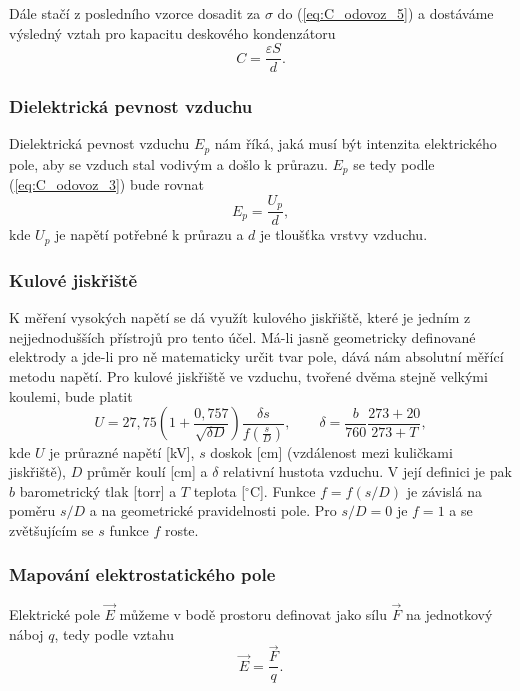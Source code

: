 \documentclass[english]{article}
\begin{document}
		Dále stačí z posledního vzorce dosadit za $\sigma$ do (\ref{eq:C_odovoz_5}) a dostáváme výsledný vztah pro kapacitu deskového kondenzátoru 
		\begin{equation} \label{eq:C_odovoz_7}
		C = \frac{\varepsilon S}{d}.
		\end{equation}
		
		\subsubsection{Dielektrická pevnost vzduchu}
		Dielektrická pevnost vzduchu $E_p$ nám říká, jaká musí být intenzita elektrického pole, aby se vzduch stal vodivým a došlo k průrazu. $E_p$ se tedy podle (\ref{eq:C_odovoz_3}) bude rovnat
		\begin{equation}
				E_p=\frac{U_p}{d},
				\label{eq:Ep}
		\end{equation}
		kde $U_p$ je napětí potřebné k průrazu a $d$ je tloušťka vrstvy vzduchu.
		
		\subsubsection{Kulové jiskřiště}
		K měření vysokých napětí se dá využít kulového jiskřiště, které je jedním z nejjednodušších přístrojů pro tento účel. Má-li jasně geometricky definované elektrody a jde-li pro ně matematicky určit tvar pole, dává nám absolutní měřící metodu napětí. Pro kulové jiskřiště ve vzduchu, tvořené dvěma stejně velkými koulemi, bude platit
		\begin{equation} \label{eq:jiskriste}
		U = 27,75 \left( 1 + \frac{0,757}{\sqrt{\delta D}} \right) \frac{\delta s}{f\left(\frac{s}{D}\right)}, \qquad \delta = \frac{b}{760}\frac{273 + 20}{273 + T},
		\end{equation}
		kde $U$ je průrazné napětí [kV], $s$ doskok [cm] (vzdálenost mezi kuličkami jiskřiště), $D$ průměr koulí [cm] a $\delta$ relativní hustota vzduchu. V její definici je pak $b$ barometrický tlak [torr] a $T$ teplota [$^\circ$C]. Funkce $f = f(s/D)$ je závislá na poměru $s/D$ a na geometrické pravidelnosti pole. Pro $s/D = 0$ je $f = 1$ a se zvětšujícím se $s$ funkce $f$ roste.
		
		\subsubsection{Mapování elektrostatického pole}
		Elektrické pole $\vec{E}$ můžeme v bodě prostoru definovat jako sílu $\vec{F}$ na jednotkový náboj $q$, tedy podle vztahu
		\begin{equation}
		\vec{E} = \frac{\vec{F}}{q}.
		\end{equation}
		
\end{document}
